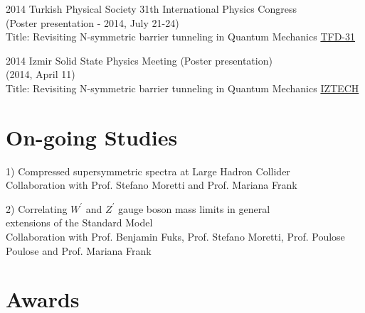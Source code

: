 \documentclass[]{friggeri-cv}
\begin{document}
\begin{entrylist}
	\entry
	{2014}
	{Turkish Physical Society 31th International Physics Congress \\ \normalfont (Poster presentation - 2014, July 21-24) \\
		Title: Revisiting N-symmetric barrier tunneling in Quantum Mechanics}
	{\href{http://www.tfd.com.tr/arsiv/TFD/31/en/default.htm}{TFD-31}}
	
	\entry
	{2014}
	{Izmir Solid State Physics Meeting  \normalfont (Poster presentation) \\ (2014, April 11) \\
		Title: Revisiting N-symmetric barrier tunneling in Quantum Mechanics}
	{\href{http://ymf.iyte.edu.tr/?page_id=234}{IZTECH}}
	
	
\end{entrylist}







\section{On-going Studies}

\begin{entrylist}
	
		\entry
{1)}
{Compressed supersymmetric spectra at Large Hadron Collider \\ \normalfont
	Collaboration with Prof. Stefano Moretti and Prof. Mariana Frank}
{\href{https://www.mitacs.ca/en/programs/globalink/globalink-research-award}{}} 
	
		\entry
{2)}
{Correlating $W^\prime$ and $Z^\prime$ gauge boson mass limits in general \\ extensions of the Standard Model \\ \normalfont
	Collaboration with Prof. Benjamin Fuks, Prof. Stefano Moretti, Prof. Poulose Poulose and Prof. Mariana Frank}
{\href{https://www.mitacs.ca/en/programs/globalink/globalink-research-award}{}} 
	
\end{entrylist}	



\newpage

\section{Awards}
\end{document}
